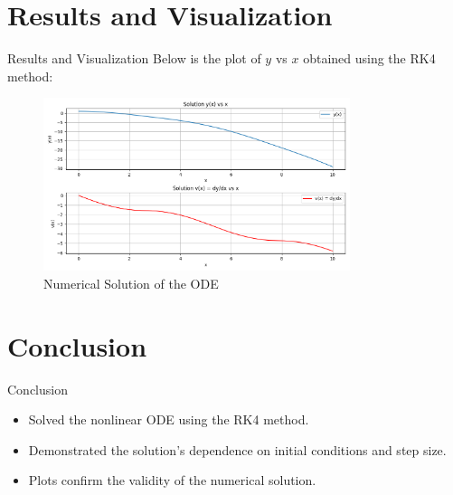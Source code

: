 \documentclass{beamer}
\begin{document}
\section{Results and Visualization}
\begin{frame}{Results and Visualization}
    Below is the plot of $y$ vs $x$ obtained using the RK4 method:
    \begin{figure}[h]
        \centering
        \includegraphics[width=0.8\textwidth]{fig/Figure_1.png}
        \caption{Numerical Solution of the ODE}
        \label{fig:example}
    \end{figure}
\end{frame}

\section{Conclusion}
\begin{frame}{Conclusion}
    \begin{itemize}
        \item Solved the nonlinear ODE using the RK4 method.
        \item Demonstrated the solution's dependence on initial conditions and step size.
        \item Plots confirm the validity of the numerical solution.
    \end{itemize}
\end{frame}
\end{document}

